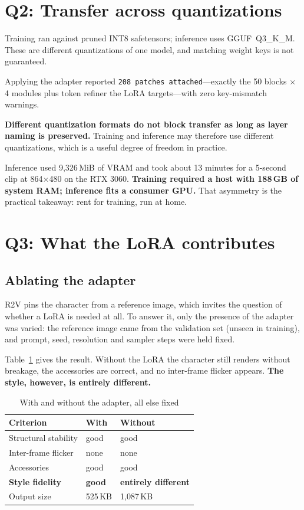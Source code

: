 \documentclass[10pt,twocolumn]{article}
\begin{document}
\section{Q2: Transfer across quantizations}

Training ran against pruned INT8 safetensors; inference uses GGUF~Q3\_K\_M. These are different quantizations of one model, and matching weight keys is not guaranteed.

Applying the adapter reported \texttt{208 patches attached}---exactly the 50 blocks $\times$ 4 modules plus token refiner the LoRA targets---with zero key-mismatch warnings.

\textbf{Different quantization formats do not block transfer as long as layer naming is preserved.} Training and inference may therefore use different quantizations, which is a useful degree of freedom in practice.

Inference used 9{,}326\,MiB of VRAM and took about 13 minutes for a 5-second clip at 864$\times$480 on the RTX 3060. \textbf{Training required a host with 188\,GB of system RAM; inference fits a consumer GPU.} That asymmetry is the practical takeaway: rent for training, run at home.

\section{Q3: What the LoRA contributes}

\subsection{Ablating the adapter}

R2V pins the character from a reference image, which invites the question of whether a LoRA is needed at all. To answer it, only the presence of the adapter was varied: the reference image came from the validation set (unseen in training), and prompt, seed, resolution and sampler steps were held fixed.

Table~\ref{tab:ablation} gives the result. Without the LoRA the character still renders without breakage, the accessories are correct, and no inter-frame flicker appears. \textbf{The style, however, is entirely different.}

\begin{table}[t]
\centering\small
\caption{With and without the adapter, all else fixed}
\label{tab:ablation}
\begin{tabular}{lll}
\toprule
Criterion & With & Without \\
\midrule
Structural stability & good & good \\
Inter-frame flicker & none & none \\
Accessories & good & good \\
\textbf{Style fidelity} & \textbf{good} & \textbf{entirely different} \\
Output size & 525\,KB & 1{,}087\,KB \\
\bottomrule
\end{tabular}
\end{table}
\end{document}
